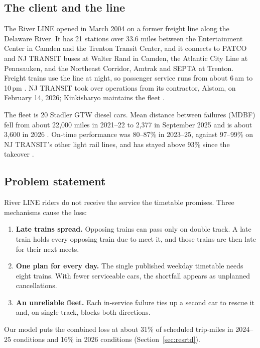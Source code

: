 \documentclass[11pt]{article}
\begin{document}
\subsection{The client and the line}
The River LINE opened in March 2004 on a former freight line along the Delaware River. It has 21 stations over 33.6 miles between the Entertainment Center in Camden and the Trenton Transit Center, and it connects to PATCO and NJ TRANSIT buses at Walter Rand in Camden, the Atlantic City Line at Pennsauken, and the Northeast Corridor, Amtrak and SEPTA at Trenton. Freight trains use the line at night, so passenger service runs from about 6\,am to 10\,pm \citep{njdot2021riverline}. NJ TRANSIT took over operations from its contractor, Alstom, on February 14, 2026; Kinkisharyo maintains the fleet \citep{njt2025board,ols2027njt}.

The fleet is 20 Stadler GTW diesel cars. Mean distance between failures (MDBF) fell from about 22{,}000 miles in 2021--22 to 2{,}377 in September 2025 and is about 3{,}600 in 2026 \citep{njt_mdbf}. On-time performance was 80--87\% in 2023--25, against 97--99\% on NJ TRANSIT's other light rail lines, and has stayed above 93\% since the takeover \citep{njtod2025,ols2027njt}.

\subsection{Problem statement}\label{sec:problem}
River LINE riders do not receive the service the timetable promises. Three mechanisms cause the loss:
\begin{enumerate}
\item \textbf{Late trains spread.} Opposing trains can pass only on double track. A late train holds every opposing train due to meet it, and those trains are then late for their next meets.
\item \textbf{One plan for every day.} The single published weekday timetable needs eight trains. With fewer serviceable cars, the shortfall appears as unplanned cancellations.
\item \textbf{An unreliable fleet.} Each in-service failure ties up a second car to rescue it and, on single track, blocks both directions.
\end{enumerate}
Our model puts the combined loss at about 31\% of scheduled trip-miles in 2024--25 conditions and 16\% in 2026 conditions (Section~\ref{sec:resrtd}).
\end{document}
